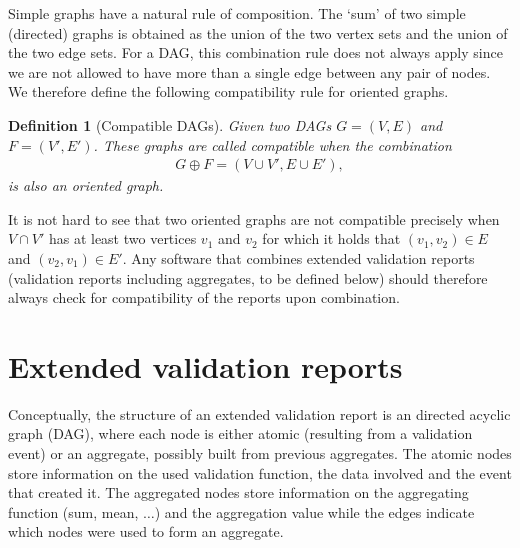 \documentclass[a4paper, 11pt,titlepage]{article}
\newtheorem{definition}{Definition}
\begin{document}
Simple graphs have a natural rule of composition. The `sum' of two simple
(directed) graphs is obtained as the union of the two vertex sets and the union
of the two edge sets. For a DAG, this combination rule does not always apply
since we are not allowed to have more than a single edge between any pair of
nodes.  We therefore define the following compatibility rule for oriented
graphs.
\begin{definition}[Compatible DAGs]
Given two DAGs $G=(V,E)$ and $F=(V',E')$. These graphs are called
\emph{compatible} when the combination
\begin{align*}
G\oplus F = (V\cup V', E\cup E'),
\end{align*}
is also an oriented graph.
\end{definition}
It is not hard to see that two oriented graphs are not compatible precisely
when $V\cap V'$ has at least two vertices $v_1$ and $v_2$ for which it holds
that $(v_1,v_2)\in E$ and $(v_2,v_1)\in E'$. Any software that combines
extended validation reports (validation reports including aggregates, to be
defined below) should therefore always check for compatibility of the reports
upon combination.








\section{Extended validation reports}
Conceptually, the structure of an extended validation report is an directed
acyclic graph (DAG), where each node is either atomic (resulting from a
validation event) or an aggregate, possibly built from previous aggregates. The
atomic nodes store information on the used validation function, the data
involved and the event that created it. The aggregated nodes store information
on the aggregating function (sum, mean, $\ldots$) and the aggregation value
while the edges indicate which nodes were used to form an aggregate. 
\end{document}
